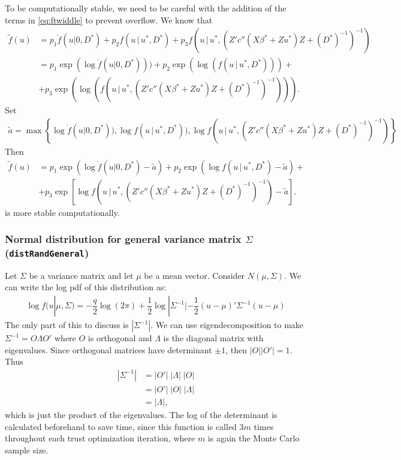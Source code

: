 \documentclass{article}
\begin{document}
To be computationally stable, we need to be careful  with the addition of the terms in \ref{eq:ftwiddle} to prevent overflow. We know that
\begin{align}
 \tilde{f}(u) &= p_1  \grave{f}(u|0,D^*)+p_2  f(u \, | \, u^*, D^*)+p_3  f(u \, | \, u^*, (Z'  c''(X \beta^*+Zu^*) Z +(D^*)^{-1}   )^{-1}) \\
&= p_1 \exp( \log  \grave{f}(u|0,D^*) ))+p_2 \exp( \log(  f(u \, | \, u^*, D^*) ))+ \nonumber\\
&+ p_3 \exp( \log( f(u \, | \, u^*, (Z'  c''(X \beta^*+Zu^*) Z +(D^*)^{-1}   )^{-1}) )).
\end{align}
Set
\begin{align}
\tilde{a}= \max \left\{ \log  \grave{f}(u|0,D^*) ), \log  f(u \, | \, u^*, D^*) ), \log f(u \, | \, u^*, (Z'  c''(X \beta^*+Zu^*) Z +(D^*)^{-1}   )^{-1})  \right\}
\end{align}
Then
\begin{align}
 \tilde{f}(u) 
&= p_1 \exp\left( \log  \grave{f}(u|0,D^*)  -\tilde{a}\right)+p_2 \exp \left( \log  f(u \, | \, u^*, D^* )-\tilde{a} \right)+ \nonumber\\
&+ p_3 \exp\left[ \log f \left(u \, | \, u^*, (Z'  c''(X \beta^*+Zu^*) Z +(D^*)^{-1}   )^{-1} \right)  -\tilde{a} \right].
\end{align}
is more stable computationally.

\subsubsection{Normal distribution for general variance matrix $\Sigma$ (\texttt{distRandGeneral})}\label{sec:Dgeneral}
Let $\Sigma$ be a variance matrix and let $\mu$ be a mean vector. Consider $N(\mu, \Sigma)$.   We can  write the log pdf of this distribution  as:
\begin{align}
\log f (u| \mu, \Sigma) = -\dfrac{q}{2} \log (2 \pi) + \dfrac{1}{2} \log |\Sigma^{-1}| - \dfrac{1}{2} (u-\mu)' \Sigma^{-1} (u-\mu)
\end{align}
 The only part of this to discuss is $|\Sigma^{-1}|$. We can use eigendecomposition to make $\Sigma^{-1}=O \Lambda O'$ where $O$ is orthogonal and $\Lambda$ is the diagonal matrix with eigenvalues. Since orthogonal matrices have determinant $\pm 1$, then $|O||O'|=1$. Thus  
\begin{align}
|\Sigma^{-1}|&=|O'| \; |\Lambda| \; |O| \\
&= |O'| \; |O| \; |\Lambda| \\
&=|\Lambda|,
\end{align}
which is just the product of the eigenvalues. The log of the determinant is calculated beforehand to save time, since this function is called $3m$ times throughout each trust optimization iteration, where $m$ is again the Monte Carlo sample size.
\end{document}
